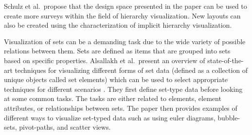 %
%

Schulz et al.\ propose that the design space presented in the paper can be used to create more surveys within the field of hierarchy visualization. New layouts can also be created using the characterization of implicit hierarchy visualization.


Visualization of sets can be a demanding task due to the wide variety of possible relations between them. Sets are defined as items that are grouped into sets based on specific properties. Alsallakh et al.\ present an overview of state-of-the-art techniques for visualizing different forms of set data (defined as a collection of unique objects called set elements) which can be used to select appropriate techniques for different scenarios \cite{alsallakh2014visualising}.
They first define set-type data before looking at some common tasks. The tasks are either related to elements, element attributes, or relationships between sets. The paper then provides examples of different ways to visualize set-typed data such as using euler diagrams, bubble-sets, pivot-paths, and scatter views.

